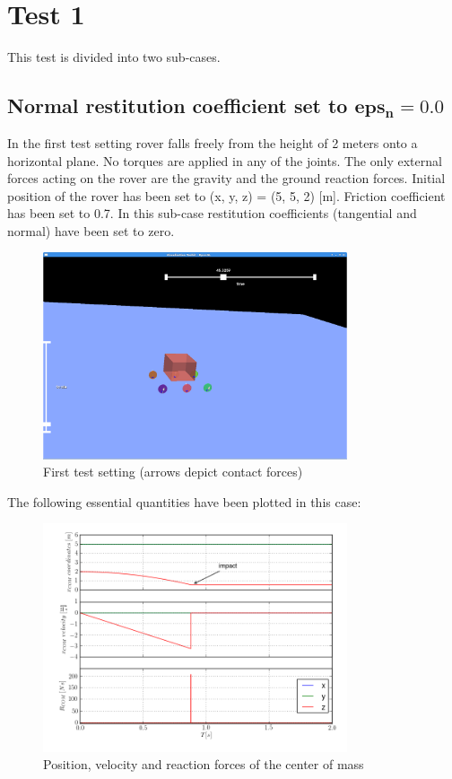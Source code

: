 \newpage
\section{Test 1}
\label{Sec:test_1}

This test is divided into two sub-cases.

\subsection{Normal restitution coefficient set to $\boldsymbol{eps_{n} = 0.0}$}

In the first test setting rover falls freely from the height of 2 meters onto a horizontal plane.
No torques are applied in any of the joints. The only external forces acting on the rover are
the gravity and the ground reaction forces. Initial position of the rover has been set to (x, y, z) = (5, 5, 2) [m].
Friction coefficient has been set to 0.7. In this sub-case restitution coefficients (tangential and normal) have been set to zero. 

\begin{figure}[H]
  \centering
    \includegraphics[width=0.8\textwidth]{run_1}
  \caption{First test setting (arrows depict contact forces)}
\end{figure}

\noindent The following essential quantities have been plotted in this case:

\begin{figure}[H]
  \centering
    \includegraphics[width=0.8\textwidth]{xvpCOM}
  \caption{Position, velocity and reaction forces of the center of mass}
\end{figure}


